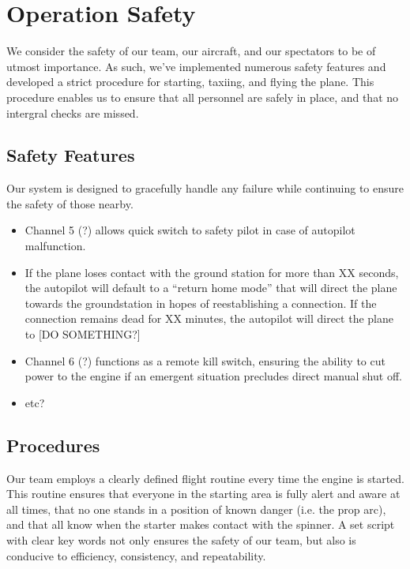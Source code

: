 \documentclass[10pt]{report}
\begin{document}
\section{Operation Safety}

We consider the safety of our team, our aircraft, and our spectators to be of utmost importance.  As such, we've implemented numerous safety features and developed a strict procedure for starting, taxiing, and flying the plane.  This procedure enables us to ensure that all personnel are safely in place, and that no intergral checks are missed.

\subsection{Safety Features}
Our system is designed to gracefully handle any failure while continuing to ensure the safety of those nearby. 
\begin{itemize}
	\setlength{\itemsep}{0cm}
	\setlength{\parskip}{0cm}
	\item Channel 5 (?) allows quick switch to safety pilot in case of autopilot malfunction.
	\item If the plane loses contact with the ground station for more than XX seconds, the autopilot will default to a ``return home mode'' that will direct the plane towards the groundstation in hopes of reestablishing a connection.  If the connection remains dead for XX minutes, the autopilot will direct the plane to [DO SOMETHING?]
	\item Channel 6 (?) functions as a remote kill switch, ensuring the ability to cut power to the engine if an emergent situation precludes direct manual shut off.
	\item etc?
\end{itemize}

\subsection{Procedures}
Our team employs a clearly defined flight routine every time the engine is started.  This routine ensures that everyone in the starting area is fully alert and aware at all times, that no one stands in a position of known danger (i.e. the prop arc), and that all know when the starter makes contact with the spinner.  A set script with clear key words not only ensures the safety of our team, but also is conducive to efficiency, consistency, and repeatability.




\end{document}
